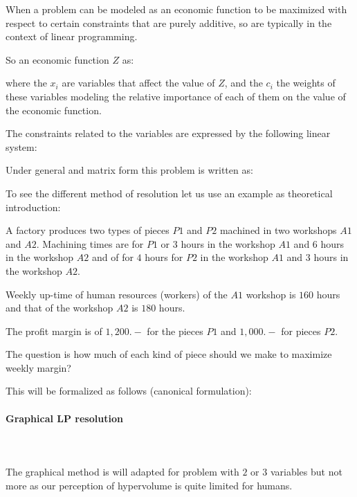 	When a problem can be modeled as an economic function to be maximized with respect to certain constraints that are purely additive, so are typically in the context of linear programming.
	
	So an economic function $Z$ as:
	
	where the $x_i$ are variables that affect the value of $Z$, and the $c_i$ the weights of these variables modeling the relative importance of each of them on the value of the economic function.
	
	The constraints  related to the variables are expressed by the following linear system:
	
	Under general and matrix form this problem is written as:
	
	
	To see the different method of resolution let us use an example as theoretical introduction:
	
	A factory produces two types of pieces $P1$ and $P2$ machined in two workshops $A1$ and $A2$. Machining times are for $P1$ or $3$ hours in the workshop $A1$ and $6$ hours in the workshop $A2$ and of for $4$ hours for $P2$ in the workshop $A1$ and $3$ hours in the workshop $A2$.
	
	Weekly up-time of human resources (workers) of the $A1$ workshop is $160$ hours and that of the workshop $A2$ is $180$ hours.
	
	The profit margin is of $1,200.-$ for the pieces $P1$ and $1,000.-$ for pieces $P2$.

	The question is how much of each kind of piece should we make to maximize weekly margin?
	
	This will be formalized as follows (canonical formulation):
	
	
	\paragraph{Graphical LP resolution}\mbox{}\\\\
	The graphical method is will adapted for problem with $2$ or $3$ variables but not more as our perception of hypervolume is quite limited for humans.
		
